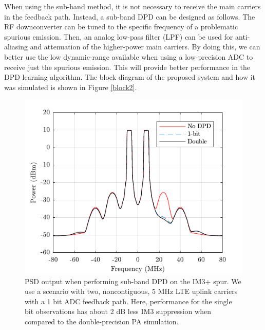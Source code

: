 \documentclass[conference]{IEEEtran}
\begin{document}
When using the sub-band method, it is not necessary to receive the main carriers in the feedback path.
Instead, a sub-band DPD can be designed as follows. 
The RF downconverter can be tuned to the specific frequency of a problematic spurious emission.
Then, an analog low-pass filter (LPF) can be used for anti-aliasing and attenuation of the higher-power main carriers. 
By doing this, we can better use the low dynamic-range available when using a low-precision ADC to receive just the spurious emission.
This will provide better performance in the DPD learning algorithm. 
The block diagram of the proposed system and how it was simulated is shown in Figure \ref{block2}.

\begin{figure}[]
	\centering
	\includegraphics[]{SubBandPSD}
	\caption{PSD output when performing sub-band DPD on the IM3+ spur. We use a scenario with two, noncontiguous, 5 MHz LTE uplink carriers with a 1 bit ADC feedback path. Here, performance for the single bit observations has about 2 dB less IM3 suppression when compared to the double-precision PA simulation. }
	\label{subbandpsd}
\end{figure}
\end{document}
